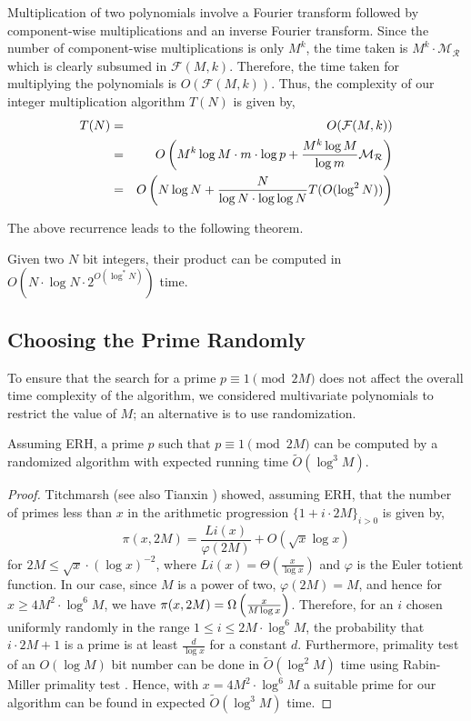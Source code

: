 \documentclass[11pt]{article}
\renewcommand{\F}{\mathcal{F}} %
\newcommand{\mr}{\mathcal{M}_\mathcal{R}} %
\begin{document}
Multiplication of two polynomials involve a Fourier transform followed
by component-wise multiplications and an inverse Fourier
transform. Since the number of component-wise multiplications is only
$M^k$, the time taken is $M^k\cdot\mr$ which is clearly subsumed in
$\F(M,k)$. Therefore, the time taken for multiplying the polynomials
is $O(\F(M,k))$. Thus, the complexity of our integer multiplication
algorithm $T(N)$ is given by,
\begin{eqnarray*}
T(N) & = & O(\F(M,k))\\
& = & O\inparen{M^k\log M\cdot m\cdot \log p + \frac{M^k\log
  M}{\log m}\mr}\\
& = & O\inparen{N\log N + \frac{N}{\log N\cdot \log\log N}T(O(\log^2N))}
\end{eqnarray*}

The above recurrence leads to the following theorem.

\begin{theorem}
Given two $N$ bit integers, their product can be computed in
$O(N\cdot \log N\cdot 2^{O(\log^*N)})$ time.
\end{theorem}
\subsection{Choosing the Prime Randomly}\label{ERH_section}

To ensure that the search for a prime $p\equiv 1\pmod{2M}$ does not
affect the overall time complexity of the algorithm, we considered
multivariate polynomials to restrict the value of $M$; an alternative is
to use randomization.

\begin{proposition}
Assuming ERH, a prime $p$ such that $p\equiv 1\pmod{2M}$ can be
computed by a randomized algorithm with expected running time
$\tilde{O}(\log^3 M)$.
\end{proposition}
\begin{proof}
Titchmarsh\cite{Titchmarsh} (see also Tianxin \cite{Tianxin})
showed, assuming ERH, that the number of primes less than $x$ in the
arithmetic progression $\{ 1 + i \cdot 2M\}_{i > 0}$ is given by,
\begin{equation*}
\pi(x,2M) = \frac{Li(x)}{\varphi(2M)} + O(\sqrt{x} \log x)
\end{equation*}
for $2M \leq \sqrt{x} \cdot (\log x)^{-2}$, where $Li(x) =
\Theta(\frac{x}{\log x})$ and $\varphi$ is the Euler totient
function. In our case, since $M$ is a power of two, $\varphi(2M) = M$,
and hence for $x \geq 4M^2 \cdot \log^6 M$, we have $\pi(x, 2M) =
\Omega\left(\frac{x}{M\log x}\right)$. Therefore, for an $i$ chosen
uniformly randomly in the range $1 \leq i \leq 2M \cdot \log^6 M$, the
probability that $i\cdot 2M + 1$ is a prime is at least $\frac{d}{\log
  x}$ for a constant $d$. Furthermore, primality test of an $O(\log
M)$ bit number can be done in $\tilde{O}(\log^2 M)$ time using
Rabin-Miller primality test \cite{Miller, Rabin}. Hence, with $x = 4M^2
\cdot \log^6 M$ a suitable prime for our algorithm can be found in
expected $\tilde{O}(\log^3 M)$ time.
\end{proof}
\end{document}
